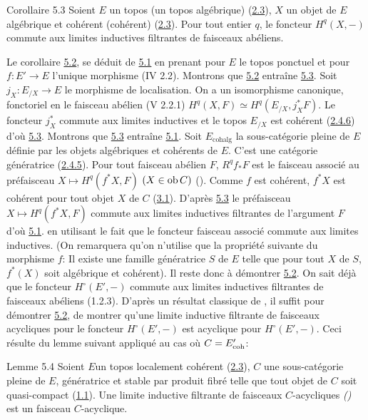 \documentclass[10pt]{../fichiers-configuration-latex/smfart}
\begin{document}
\begin{enonce*}{Corollaire 5.3}
Soient $E$ un topos (\resp un topos algébrique) (\hyperref[VI.def2.3]{2.3}), $X$ un objet de
$E$ algébrique et cohérent (\resp cohérent) (\hyperref[VI.def2.3]{2.3}). Pour tout entier
$q$, le foncteur $H^q (X, -)$ commute aux limites inductives
filtrantes de faisceaux abéliens.
\end{enonce*}

Le corollaire \hyperref[VI.cor5.2]{5.2}, se déduit de \hyperref[VI.thm5.1]{5.1} en prenant pour $E$ le topos
ponctuel et pour $f : E'\to E$ l'unique morphisme (IV 2.2). Montrons
que \hyperref[VI.cor5.2]{5.2} entraîne \hyperref[VI.cor5.3]{5.3}. Soit $j_X : E_{/X} \to E$ le morphisme de
localisation. On a un isomorphisme canonique, fonctoriel en le
faisceau abélien (V 2.2.1) $H^q (X, F) \simeq H^q(E_{/X}, j^{\ast}_X
F)$. Le foncteur $j^{\ast}_X$ commute aux limites inductives et le
topos $E_{/X}$ est cohérent (\hyperref[VI.subsubsec2.4.6]{2.4.6}) d'où \hyperref[VI.cor5.3]{5.3}. Montrons que \hyperref[VI.cor5.3]{5.3}
entraîne \hyperref[VI.thm5.1]{5.1}. Soit $E_{\text{cohalg}}$ la sous-catégorie pleine de $E$
définie par les objets algébriques et cohérents de $E$. C'est une
catégorie génératrice (\hyperref[VI.subsubsec2.4.5]{2.4.5}). Pour tout faisceau abélien $F$, $R^q
f_{\ast} F$ est le faisceau associé au préfaisceau $X \mapsto
H^q(f^{\ast} X, F)$ $(X \in \operatorname{ob} C)$ (). Comme $f$ est cohérent,
$f^{\ast}X$ est cohérent pour tout objet $X$ de $C$ (\hyperref[VI.def3.1]{3.1}). D'après \hyperref[VI.cor5.3]{5.3}
le préfaisceau $X \mapsto H^q (f^{\ast} X, F)$ commute aux
limites inductives filtrantes de l'argument $F$ d'où \hyperref[VI.thm5.1]{5.1}. en utilisant
le fait que le foncteur faisceau associé commute aux limites
inductives. (On remarquera qu'on n'utilise que la propriété suivante
du morphisme $f$: Il existe une famille génératrice $S$ de $E$ telle
que pour tout $X$ de $S$, $f^{\ast}(X)$ soit algébrique et
cohérent). Il reste donc à démontrer \hyperref[VI.cor5.2]{5.2}. On sait déjà que le foncteur
$H^{\circ} (E', -)$ commute aux limites inductives filtrantes de
faisceaux abéliens (1.2.3). D'après un résultat classique de \cite{SGA4-06:7}, il
suffit pour démontrer \hyperref[VI.cor5.2]{5.2}, de montrer qu'une limite inductive
filtrante de faisceaux acycliques pour le foncteur $H^{\circ}(E', -)$
est acyclique pour $H^{\circ} (E', -)$. Ceci résulte du lemme suivant
appliqué au cas où $C = E'_{\mathrm{coh}}$:

\begin{enonce*}{Lemme 5.4}
Soient $E$\pageoriginale un topos localement cohérent (\hyperref[VI.def2.3]{2.3}), $C$ une
sous-catégorie pleine de $E$, génératrice et stable par produit fibré telle que tout
objet de $C$ soit quasi-compact (\hyperref[VI.def1.1]{1.1}). Une limite inductive filtrante
de faisceaux $C$-acycliques \emph{()} est un faisceau $C$-acyclique.
\end{enonce*}
\end{document}
